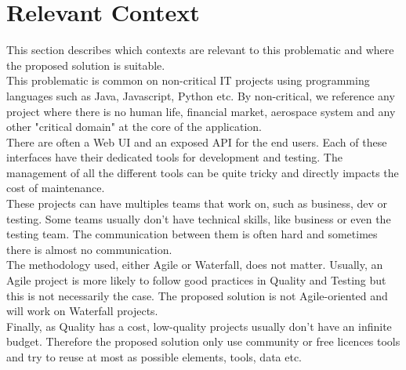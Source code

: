 \section{Relevant Context}\label{sec:relevant-context}
This section describes which contexts are relevant to this problematic and
where the proposed solution is suitable. \\
This problematic is common on non-critical IT projects using
programming languages such as Java, Javascript, Python etc.
By non-critical, we reference any project where there is no human life,
financial market, aerospace system and any other "critical domain" at the
core of the application. \\
There are often a Web UI and an exposed API for the end users.
Each of these interfaces have their dedicated tools for development and
testing.
The management of all the different tools can be quite tricky and directly
impacts the cost of maintenance. \\
These projects can have multiples teams that work on, such as business,
dev or testing.
Some teams usually don't have technical skills, like business or even the
testing team.
The communication between them is often hard and sometimes there is almost
no communication. \\
The methodology used, either Agile or Waterfall, does not matter.
Usually, an Agile project is more likely to follow good practices in
Quality and Testing but this is not necessarily the case.
The proposed solution is not Agile-oriented and will work on Waterfall
projects. \\
Finally, as Quality has a cost, low-quality projects usually don't have an
infinite budget.
Therefore the proposed solution only use community or free licences tools
and try to reuse at most as possible elements, tools, data etc.


